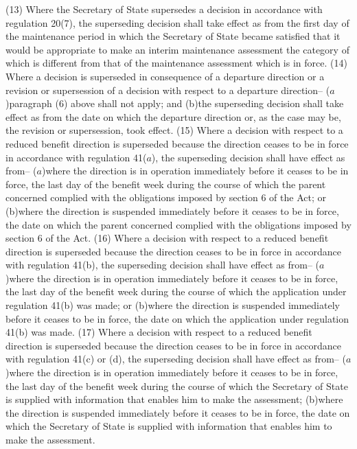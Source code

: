 \documentclass[12pt,a4paper]{article}
\begin{document}
(13) Where the Secretary of State supersedes a decision in accordance with regulation 20(7), the superseding decision shall take effect as from the first day of the maintenance period in which the Secretary of State became satisfied that it would be appropriate to make an interim maintenance assessment the category of which is different from that of the maintenance assessment which is in force.
(14) Where a decision is superseded in consequence of a departure direction or a revision or supersession of a decision with respect to a departure direction–
($a$)paragraph (6) above shall not apply; and
(b)the superseding decision shall take effect as from the date on which the departure direction or, as the case may be, the revision or supersession, took effect.
(15) Where a decision with respect to a reduced benefit direction is superseded because the direction ceases to be in force in accordance with regulation 41($a$), the superseding decision shall have effect as from–
($a$)where the direction is in operation immediately before it ceases to be in force, the last day of the benefit week during the course of which the parent concerned complied with the obligations imposed by section 6 of the Act; or
(b)where the direction is suspended immediately before it ceases to be in force, the date on which the parent concerned complied with the obligations imposed by section 6 of the Act.
(16) Where a decision with respect to a reduced benefit direction is superseded because the direction ceases to be in force in accordance with regulation 41(b), the superseding decision shall have effect as from–
($a$)where the direction is in operation immediately before it ceases to be in force, the last day of the benefit week during the course of which the application under regulation 41(b) was made; or
(b)where the direction is suspended immediately before it ceases to be in force, the date on which the application under regulation 41(b) was made.
(17) Where a decision with respect to a reduced benefit direction is superseded because the direction ceases to be in force in accordance with regulation 41(c) or (d), the superseding decision shall have effect as from–
($a$)where the direction is in operation immediately before it ceases to be in force, the last day of the benefit week during the course of which the Secretary of State is supplied with information that enables him to make the assessment;
(b)where the direction is suspended immediately before it ceases to be in force, the date on which the Secretary of State is supplied with information that enables him to make the assessment.
\end{document}
